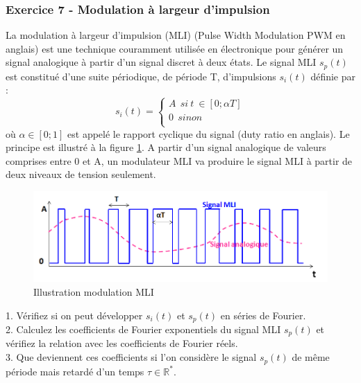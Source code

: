 \documentclass[11pt]{report}
\begin{document}
	\subsubsection{Exercice 7 - Modulation à largeur d'impulsion}
	La modulation à largeur d'impulsion (MLI) (Pulse Width Modulation PWM en anglais) est une technique couramment utilisée en électronique pour générer un signal analogique à partir d'un signal discret à deux états. Le signal MLI $s_p(t)$ est constitué d'une suite périodique, de période T, d'impulsions $s_i(t)$ définie par :
	\begin{equation*}
	s_i(t)=\left \{
	\begin{array}{l}
	A~~si~t~\in[0;\alpha T] \\
	0~~sinon \\
	\end{array}
	\right .
	\end{equation*}   
	où $\alpha \in [0;1]$ est appelé le rapport cyclique du signal (duty ratio en anglais). Le principe est illustré à la figure \ref{Fig:signal_MLI}. A partir d'un signal analogique de valeurs comprises entre 0 et A, un modulateur MLI va produire le signal MLI à partir de deux niveaux de tension seulement.\\
	
	\begin{figure}[h!]
		\centering
		\includegraphics[scale=0.6]{images/signal_MLI.png}
		\caption{Illustration modulation MLI}	
		\label{Fig:signal_MLI} 
	\end{figure}
	
	1. Vérifiez si on peut développer $s_i(t)$ et $s_p(t)$ en séries de Fourier. \\
	
	2. Calculez les coefficients de Fourier exponentiels du signal MLI $s_p(t)$ et vérifiez la relation avec les coefficients de Fourier réels.\\
	
	3. Que deviennent ces coefficients si l'on considère le signal $s_p(t)$ de même période mais retardé d'un temps $\tau \in \mathbb{R^{*}}$.\\
	
\end{document}
